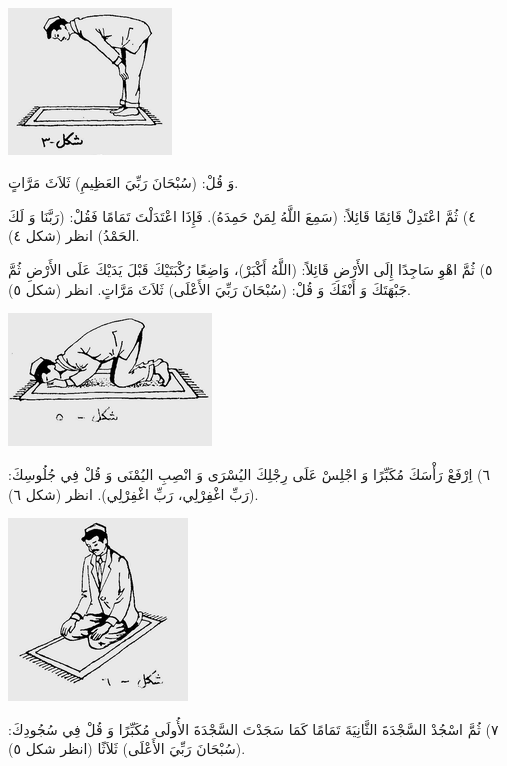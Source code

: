 \documentclass[a5paper]{article}
\begin{document}
\begin{center}
\includegraphics[width=1.7075in,height=1.5283in]{MuhammadBagauddinlatinized-img346.png}
\end{center}
وَ قُلْ: (سُبْحَانَ رَبِّيَ العَظِيمِ) ثَلاَثَ مَرَّاتٍ.

٤) ثُمَّ اعْتَدِلْ قَائِمًا قَائِلاً: (سَمِعَ اللَّهُ لِمَنْ حَمِدَهُ). فَإِذَا اعْتَدَلْتَ تَمَامًا فَقُلْ: (رَبَّنَا وَ لَكَ الحَمْدُ) انظر (شكل ٤).

٥) ثُمَّ اهْوِ سَاجِدًا إِلَى الأَرْضِ قَائِلاً: (اللَّهُ أَكْبَرْ)، وَاضِعًا رُكْبَتَيْكَ قَبْلَ يَدَيْكَ عَلَى الأَرْضِ ثُمَّ جَبْهَتَكَ وَ أَنْفَكَ وَ قُلْ: (سُبْحَانَ رَبِّيَ الأَعْلَى) ثَلاَثَ مَرَّاتٍ. انظر (شكل ٥).

\begin{center}
\includegraphics[width=2.1228in,height=1.3866in]{MuhammadBagauddinlatinized-img347.png}
\end{center}
٦) اِرْفَعْ رَأْسَكَ مُكَبِّرًا وَ اجْلِسْ عَلَى رِجْلِكَ اليُسْرَى وَ انْصِبِ اليُمْنَى وَ قُلْ فِي جُلُوسِكَ: (رَبِّ اغْفِرْلِي، رَبِّ اغْفِرْلِي). انظر (شكل ٦).

\begin{center}
\includegraphics[width=1.8772in,height=1.9055in]{MuhammadBagauddinlatinized-img348.png}
\end{center}
٧) ثُمَّ اسْجُدْ السَّجْدَةَ الثَّانِيَةَ تَمَامًا كَمَا سَجَدْتَ السَّجْدَةَ الأُولَى مُكَبِّرًا وَ قُلْ فِي سُجُودِكَ: (سُبْحَانَ رَبِّيَ الأَعْلَى) ثَلاَثًا (انظر شكل ٥).
\end{document}
